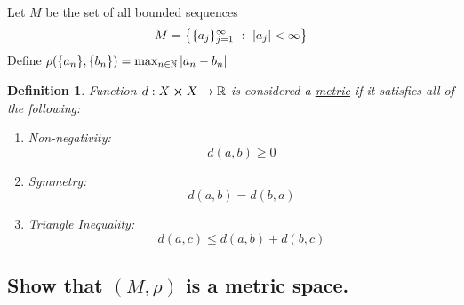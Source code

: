 \documentclass[]{article}
\newcommand{\R}{\mathbb{R}}
\newcommand{\N}{\mathbb{N}}
\newcommand{\st}{\ : \ }
\newtheorem{definition}{Definition}
\begin{document}
\newpage
\section{}
Let $M$ be the set of all bounded sequences
\[
    M = \qty{\{a_j\}_{j=1}^{\infty} \st \abs{a_j} < \infty}
\]
Define $\rho(\{a_n\},\{b_n\}) = \max_{n \in \N} \abs{a_n - b_n}$

\begin{definition}\label{def:metric}
    Function $d : X \cross X \to \R$ is considered a \underline{\emph{metric}} 
    if it satisfies all of the following:
    \begin{enumerate}
        \item Non-negativity:
            \[d(a,b) \geq 0\]
        \item Symmetry:
            \[d(a,b) = d(b,a)\]
        \item Triangle Inequality:
            \[d(a,c) \leq d(a,b) + d(b,c)\]
    \end{enumerate}
\end{definition}

\subsection{Show that $(M,\rho)$ is a metric space.}
\end{document}
